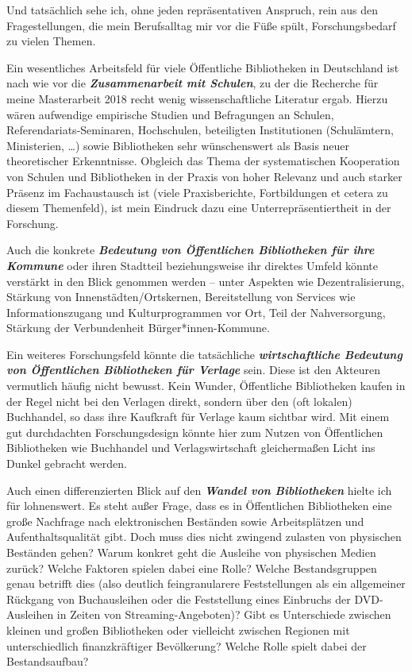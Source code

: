 \documentclass[a4paper,
fontsize=11pt,
oneside,
numbers=noperiodatend,
parskip=half-,
bibliography=totoc,
final
]{scrartcl}
\begin{document}
Und tatsächlich sehe ich, ohne jeden repräsentativen Anspruch, rein aus
den Fragestellungen, die mein Berufsalltag mir vor die Füße spült,
Forschungsbedarf zu vielen Themen.

Ein wesentliches Arbeitsfeld für viele Öffentliche Bibliotheken in
Deutschland ist nach wie vor die \textbf{\emph{Zusammenarbeit mit
Schulen}}, zu der die Recherche für meine Masterarbeit 2018 recht wenig
wissenschaftliche Literatur ergab. Hierzu wären aufwendige empirische
Studien und Befragungen an Schulen, Referendariats-Seminaren,
Hochschulen, beteiligten Institutionen (Schulämtern, Ministerien,
\ldots) sowie Bibliotheken sehr wünschenswert als Basis neuer
theoretischer Erkenntnisse. Obgleich das Thema der systematischen
Kooperation von Schulen und Bibliotheken in der Praxis von hoher
Relevanz und auch starker Präsenz im Fachaustausch ist (viele
Praxisberichte, Fortbildungen et cetera zu diesem Themenfeld), ist mein
Eindruck dazu eine Unterrepräsentiertheit in der Forschung.

Auch die konkrete \textbf{\emph{Bedeutung von Öffentlichen Bibliotheken
für ihre Kommune}} oder ihren Stadtteil beziehungsweise ihr direktes
Umfeld könnte verstärkt in den Blick genommen werden -- unter Aspekten
wie Dezentralisierung, Stärkung von Innenstädten/Ortskernen,
Bereitstellung von Services wie Informationszugang und Kulturprogrammen
vor Ort, Teil der Nahversorgung, Stärkung der Verbundenheit
Bürger*innen-Kommune.

Ein weiteres Forschungsfeld könnte die tatsächliche
\textbf{\emph{wirtschaftliche Bedeutung von Öffentlichen Bibliotheken
für Verlage}} sein. Diese ist den Akteuren vermutlich häufig nicht
bewusst. Kein Wunder, Öffentliche Bibliotheken kaufen in der Regel nicht
bei den Verlagen direkt, sondern über den (oft lokalen) Buchhandel, so
dass ihre Kaufkraft für Verlage kaum sichtbar wird. Mit einem gut
durchdachten Forschungsdesign könnte hier zum Nutzen von Öffentlichen
Bibliotheken wie Buchhandel und Verlagswirtschaft gleichermaßen Licht
ins Dunkel gebracht werden.

Auch einen differenzierten Blick auf den \textbf{\emph{Wandel von
Bibliotheken}} hielte ich für lohnenswert. Es steht außer Frage, dass es
in Öffentlichen Bibliotheken eine große Nachfrage nach elektronischen
Beständen sowie Arbeitsplätzen und Aufenthaltsqualität gibt. Doch muss
dies nicht zwingend zulasten von physischen Beständen gehen? Warum
konkret geht die Ausleihe von physischen Medien zurück? Welche Faktoren
spielen dabei eine Rolle? Welche Bestandsgruppen genau betrifft dies
(also deutlich feingranularere Feststellungen als ein allgemeiner
Rückgang von Buchausleihen oder die Feststellung eines Einbruchs der
DVD-Ausleihen in Zeiten von Streaming-Angeboten)? Gibt es Unterschiede
zwischen kleinen und großen Bibliotheken oder vielleicht zwischen
Regionen mit unterschiedlich finanzkräftiger Bevölkerung? Welche Rolle
spielt dabei der Bestandsaufbau?
\end{document}
